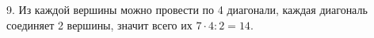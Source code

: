 9. Из каждой вершины можно провести по 4 диагонали, каждая диагональ соединяет 2 вершины, значит всего их $7\cdot4:2=14.$\\
